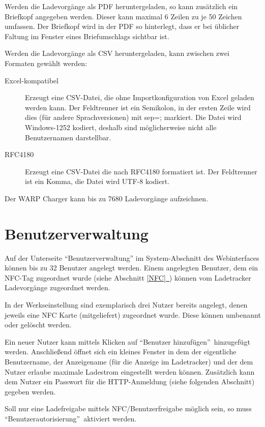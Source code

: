 \documentclass[a4paper,10pt]{article}
\newcommand*{\fullref}[1]{Abschnitt \hyperref[{#1}]{\ref*{#1}~\nameref*{#1}}}
\begin{document}
\begin{multicols*}{2}
    Werden die Ladevorgänge als PDF heruntergeladen, so kann zusätzlich ein
	Briefkopf angegeben werden. Dieser kann maximal 6 Zeilen zu je 50 Zeichen
    umfassen. Der Briefkopf wird in der PDF so hinterlegt, dass er bei üblicher Faltung im Fenster eines Briefumschlags sichtbar ist.

    Werden die Ladevorgänge als CSV heruntergeladen, kann zwischen zwei Formaten
	gewählt werden:
    \begin{description}
     \item[Excel-kompatibel] Erzeugt eine CSV-Datei, die ohne Importkonfiguration von Excel geladen werden kann. Der Feldtrenner ist ein Semikolon, in der ersten Zeile wird dies (für andere Sprachversionen) mit sep=; markiert. Die Datei wird Windows-1252 kodiert, deshalb sind möglicherweise nicht alle Benutzernamen darstellbar.
     \item[RFC4180] Erzeugt eine CSV-Datei die nach RFC4180 formatiert ist. Der Feldtrenner ist ein Komma, die Datei wird UTF-8 kodiert.
    \end{description}

    Der WARP Charger kann bis zu 7680 Ladevorgänge aufzeichnen.

    \vfill
    \null
    \newpage

    \section{Benutzerverwaltung} \label{user_management}

    Auf der Unterseite \enquote{Benutzerverwaltung} im System-Abschnitt des Webinterfaces können bis zu 32 Benutzer angelegt werden.
    Einem angelegten Benutzer, dem ein NFC-Tag zugeordnet wurde (siehe \fullref{NFC}) können vom Ladetracker Ladevorgänge zugeordnet werden.

    In der Werkseinstellung sind exemplarisch drei Nutzer bereits angelegt,
    denen jeweils eine NFC Karte (mitgeliefert) zugeordnet wurde. Diese können
    umbenannt oder gelöscht werden.

    Ein neuer Nutzer kann mittels Klicken auf \enquote{Benutzer hinzufügen}~hinzugefügt werden.
    Anschließend öffnet sich ein kleines Fenster in dem der eigentliche Benutzername, der Anzeigename (für die Anzeige im Ladetracker)
    und der dem Nutzer erlaube maximale Ladestrom eingestellt werden können.
    Zusätzlich kann dem Nutzer ein Passwort für die HTTP-Anmeldung (siehe
    folgenden Abschnitt) gegeben werden.

    Soll nur eine Ladefreigabe mittels NFC/Benutzerfreigabe möglich sein, so
    muss \enquote{Benutzerautorisierung}~aktiviert werden.


\end{multicols*}
\end{document}
